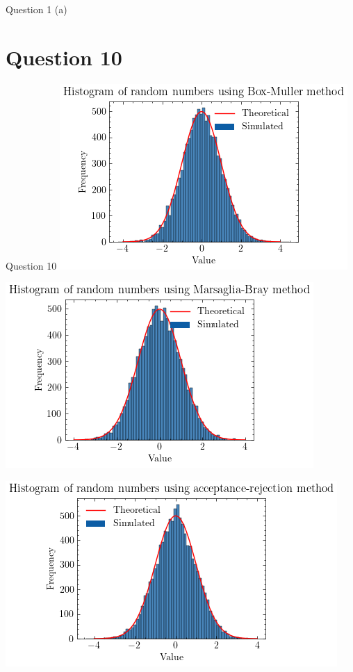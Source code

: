\documentclass[compress,12pt]{beamer}
\begin{document}
\begin{frame}{Question 1 (a)}
\section{Question 10}
\begin{frame}{Question 10}
\centering
\includegraphics[scale=0.7]{imgs/boxmuller.png}  
\end{frame}
\begin{frame}
 \centering
 \includegraphics[scale=0.7]{imgs/marsagliabray.png}  \\
\end{frame}
\begin{frame}
 \centering
 \includegraphics[scale=0.7]{imgs/acceptancerejection.png}  \\

\end{frame}
\end{frame}
\end{document}
